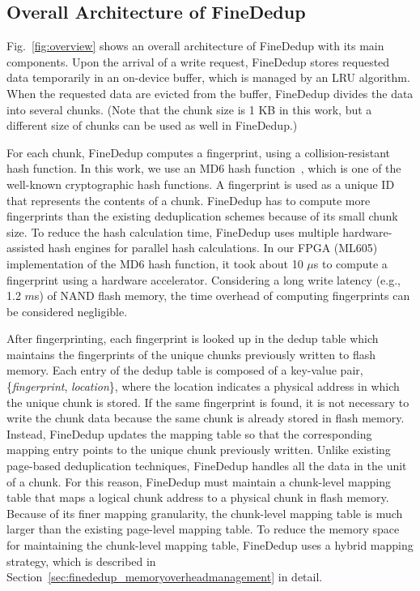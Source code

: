 \subsection{Overall Architecture of FineDedup}
\label{sec:finededup_architecture}

Fig.~\ref{fig:overview} shows an overall architecture of FineDedup with its main components.
Upon the arrival of a write request,
FineDedup stores requested data temporarily in an on-device buffer,
which is managed by an LRU algorithm.
When the requested data are evicted from the buffer,
FineDedup divides the data into several chunks.
(Note that the chunk size is 1 KB in this work, 
but a different size of chunks can be used as well in FineDedup.)

For each chunk, FineDedup computes a fingerprint, using a collision-resistant hash function.
In this work, we use an MD6 hash function~\cite{md6}, which is one of the well-known cryptographic hash functions.
A fingerprint is used as a unique ID that represents the contents of a chunk.
FineDedup has to compute more fingerprints than the existing deduplication schemes
because of its small chunk size.
To reduce the hash calculation time,
FineDedup uses multiple hardware-assisted hash engines for parallel hash calculations. 
In our FPGA (ML605) implementation of the MD6 hash function, it took about 10 $\mu$s to compute a fingerprint using a hardware accelerator.
Considering a long write latency (e.g., 1.2 $m$s) of NAND flash memory,
the time overhead of computing fingerprints can be considered negligible.

After fingerprinting, 
each fingerprint is looked up in the dedup table
which maintains the fingerprints of the unique chunks previously written to flash memory.
Each entry of the dedup table is composed of a key-value pair, \{\textit{fingerprint}, \textit{location}\},
where the location indicates a physical address in which the unique chunk is stored.
If the same fingerprint is found,
it is not necessary to write the chunk data
because the same chunk is already stored in flash memory.
Instead, FineDedup updates the mapping table 
so that the corresponding mapping entry points to the unique chunk previously written.
Unlike existing page-based deduplication techniques,
FineDedup handles all the data in the unit of a chunk.
For this reason, FineDedup must maintain a chunk-level mapping table
that maps a logical chunk address to a physical chunk in flash memory.
Because of its finer mapping granularity,
the chunk-level mapping table is much larger than the existing page-level mapping table.
To reduce the memory space for maintaining the chunk-level mapping table,
FineDedup uses a hybrid mapping strategy,
which is described in Section~\ref{sec:finededup_memoryoverheadmanagement} in detail.

